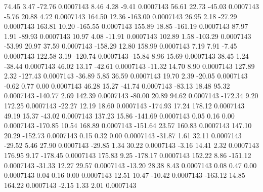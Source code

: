        74.45        3.47      -72.76     0.0007143
        8.46        4.28       -9.41     0.0007143
       56.61       22.73      -45.03     0.0007143
       -5.76       20.88        4.72     0.0007143
      164.50       12.36     -163.00     0.0007143
       26.95        2.18      -27.29     0.0007143
      163.81       10.20     -165.55     0.0007143
      155.89       18.85     -161.19     0.0007143
       87.97        1.91      -89.93     0.0007143
       10.97        4.08      -11.91     0.0007143
      102.89        1.58     -103.29     0.0007143
      -53.99       20.97       37.59     0.0007143
     -158.29       12.80      158.99     0.0007143
        7.19        7.91       -7.45     0.0007143
      122.58        3.19     -120.74     0.0007143
      -15.84        8.96       15.69     0.0007143
       38.45        1.24      -38.44     0.0007143
       46.02       13.17      -42.61     0.0007143
      -11.32       14.70        8.90     0.0007143
      127.89        2.32     -127.43     0.0007143
      -36.89        5.85       36.59     0.0007143
       19.70        2.39      -20.05     0.0007143
       -0.62        0.77        0.00     0.0007143
       46.28       15.27      -41.74     0.0007143
      -83.13       18.48       95.32     0.0007143
     -140.77        2.69      142.39     0.0007143
      -80.00       20.89       94.62     0.0007143
     -172.34        9.20      172.25     0.0007143
      -22.27       12.19       18.60     0.0007143
     -174.93       17.24      178.12     0.0007143
       49.19       15.37      -43.02     0.0007143
      137.23       15.86     -141.69     0.0007143
        0.05        0.16        0.00     0.0007143
     -170.85       10.54      168.89     0.0007143
     -151.64       23.57      160.83     0.0007143
      147.10       20.29     -152.73     0.0007143
        0.15        0.32        0.00     0.0007143
      -31.87        1.61       32.11     0.0007143
      -29.52        5.46       27.90     0.0007143
      -29.85        1.34       30.22     0.0007143
       -3.16       14.41        2.32     0.0007143
      176.95        9.17     -178.45     0.0007143
      175.83        9.25     -178.17     0.0007143
      152.22        8.86     -151.12     0.0007143
      -31.33       12.27       29.57     0.0007143
      -13.20       28.38        8.43     0.0007143
        0.08        0.47        0.00     0.0007143
        0.04        0.16        0.00     0.0007143
       12.51       10.47      -10.42     0.0007143
     -163.12       14.85      164.22     0.0007143
       -2.15        1.33        2.01     0.0007143
